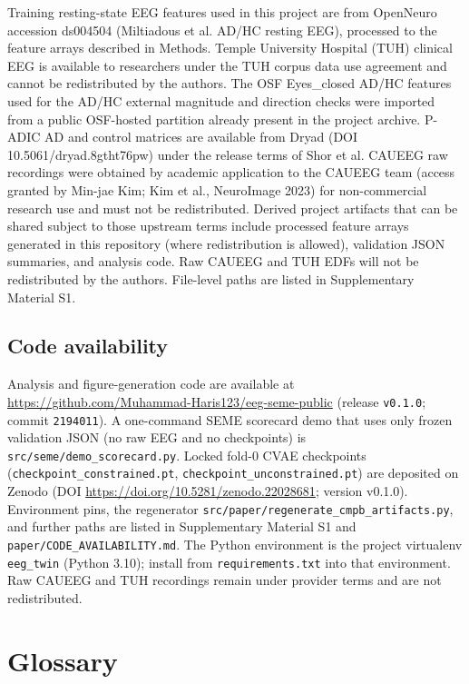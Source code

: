 Training resting-state EEG features used in this project are from OpenNeuro accession ds004504 (Miltiadous et al. AD/HC resting EEG), processed to the feature arrays described in Methods. Temple University Hospital (TUH) clinical EEG is available to researchers under the TUH corpus data use agreement and cannot be redistributed by the authors. The OSF Eyes\_closed AD/HC features used for the AD/HC external magnitude and direction checks were imported from a public OSF-hosted partition already present in the project archive. P-ADIC AD and control matrices are available from Dryad (DOI 10.5061/dryad.8gtht76pw) under the release terms of Shor et al. CAUEEG raw recordings were obtained by academic application to the CAUEEG team (access granted by Min-jae Kim; Kim et al., NeuroImage 2023) for non-commercial research use and must not be redistributed. Derived project artifacts that can be shared subject to those upstream terms include processed feature arrays generated in this repository (where redistribution is allowed), validation JSON summaries, and analysis code. Raw CAUEEG and TUH EDFs will not be redistributed by the authors. File-level paths are listed in Supplementary Material S1.



\subsection{Code availability}

Analysis and figure-generation code are available at \url{https://github.com/Muhammad-Haris123/eeg-seme-public} (release \texttt{v0.1.0}; commit \texttt{2194011}). A one-command SEME scorecard demo that uses only frozen validation JSON (no raw EEG and no checkpoints) is \texttt{src/seme/demo\_scorecard.py}. Locked fold-0 CVAE checkpoints (\texttt{checkpoint\_constrained.pt}, \texttt{checkpoint\_unconstrained.pt}) are deposited on Zenodo (DOI \url{https://doi.org/10.5281/zenodo.22028681}; version v0.1.0). Environment pins, the regenerator \texttt{src/paper/regenerate\_cmpb\_artifacts.py}, and further paths are listed in Supplementary Material S1 and \texttt{paper/\allowbreak{}CODE\_\allowbreak{}AVAILABILITY.\allowbreak{}md}. The Python environment is the project virtualenv \texttt{eeg\_twin} (Python 3.10); install from \texttt{requirements.\allowbreak{}txt} into that environment. Raw CAUEEG and TUH recordings remain under provider terms and are not redistributed.



\section*{Glossary}

